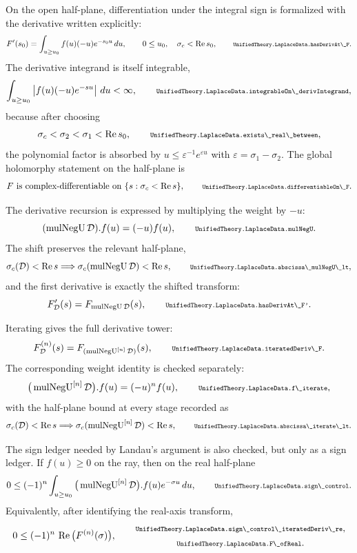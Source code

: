 \documentclass[11pt]{article}
\newcommand{\lean}[1]{\relax\ifmmode\hbox{\scriptsize\ttfamily\detokenize{#1}}\else{\small\texttt{\detokenize{#1}}}\fi}
\begin{document}
On the open half-plane, differentiation under the integral sign is formalized with the derivative written explicitly:
$$
  F'(s_0)
  =
  \int_{u\ge u_0} f(u)(-u)e^{-s_0u}\,du,
  \qquad
  0\le u_0,\quad \sigma_c<\operatorname{Re}s_0,
  \qquad
  \lean{UnifiedTheory.LaplaceData.hasDerivAt\_F}.
$$
The derivative integrand is itself integrable,
$$
  \int_{u\ge u_0}\left|f(u)(-u)e^{-su}\right|\,du<\infty,
  \qquad
  \lean{UnifiedTheory.LaplaceData.integrableOn\_derivIntegrand},
$$
because after choosing
$$
  \sigma_c<\sigma_2<\sigma_1<\operatorname{Re}s_0,
  \qquad
  \lean{UnifiedTheory.LaplaceData.exists\_real\_between},
$$
the polynomial factor is absorbed by $u\le\varepsilon^{-1}e^{\varepsilon u}$ with $\varepsilon=\sigma_1-\sigma_2$.  The global holomorphy statement on the half-plane is
$$
  F\ \hbox{is complex-differentiable on}\ \{s:\sigma_c<\operatorname{Re}s\},
  \qquad
  \lean{UnifiedTheory.LaplaceData.differentiableOn\_F}.
$$

The derivative recursion is expressed by multiplying the weight by $-u$:
$$
  (\operatorname{mulNegU}\mathcal D).f(u)=(-u)f(u),
  \qquad
  \lean{UnifiedTheory.LaplaceData.mulNegU}.
$$
The shift preserves the relevant half-plane,
$$
  \sigma_c(\mathcal D)<\operatorname{Re}s
  \Longrightarrow
  \sigma_c(\operatorname{mulNegU}\mathcal D)<\operatorname{Re}s,
  \qquad
  \lean{UnifiedTheory.LaplaceData.abscissa\_mulNegU\_lt},
$$
and the first derivative is exactly the shifted transform:
$$
  F_{\mathcal D}'(s)=F_{\operatorname{mulNegU}\mathcal D}(s),
  \qquad
  \lean{UnifiedTheory.LaplaceData.hasDerivAt\_F'}.
$$

Iterating gives the full derivative tower:
$$
  F_{\mathcal D}^{(n)}(s)
  =
  F_{(\operatorname{mulNegU}^{[n]}\mathcal D)}(s),
  \qquad
  \lean{UnifiedTheory.LaplaceData.iteratedDeriv\_F}.
$$
The corresponding weight identity is checked separately:
$$
  \big(\operatorname{mulNegU}^{[n]}\mathcal D\big).f(u)
  =
  (-u)^n f(u),
  \qquad
  \lean{UnifiedTheory.LaplaceData.f\_iterate},
$$
with the half-plane bound at every stage recorded as
$$
  \sigma_c(\mathcal D)<\operatorname{Re}s
  \Longrightarrow
  \sigma_c(\operatorname{mulNegU}^{[n]}\mathcal D)<\operatorname{Re}s,
  \qquad
  \lean{UnifiedTheory.LaplaceData.abscissa\_iterate\_lt}.
$$

The sign ledger needed by Landau's argument is also checked, but only as a sign ledger.  If $f(u)\ge0$ on the ray, then on the real half-plane
$$
  0\le
  (-1)^n
  \int_{u\ge u_0}
    \big(\operatorname{mulNegU}^{[n]}\mathcal D\big).f(u)e^{-\sigma u}\,du,
  \qquad
  \lean{UnifiedTheory.LaplaceData.sign\_control}.
$$
Equivalently, after identifying the real-axis transform,
$$
  0\le (-1)^n\,\operatorname{Re}\big(F^{(n)}(\sigma)\big),
  \qquad
  \begin{gathered}
  \lean{UnifiedTheory.LaplaceData.sign\_control\_iteratedDeriv\_re},\\
  \lean{UnifiedTheory.LaplaceData.F\_ofReal}.
  \end{gathered}
$$
\end{document}
